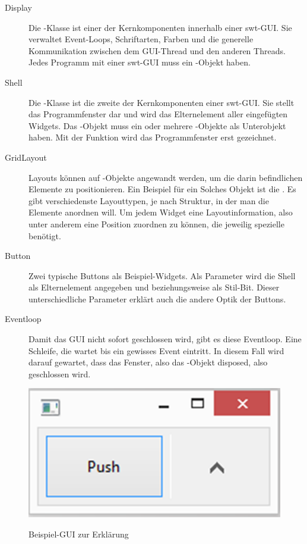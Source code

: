 \begin{description}
	\item[{Display}]
    Die -Klasse ist einer der Kernkomponenten innerhalb einer \acrshort{swt}-\acrshort{GUI}.
    Sie verwaltet Event-Loops, Schriftarten, Farben und die generelle Kommunikation zwischen dem \acrshort{GUI}-Thread
    und den anderen Threads. Jedes Programm mit einer \acrshort{swt}-\acrshort{GUI} muss ein -Objekt haben.

    \item[{Shell}]
    Die -Klasse ist die zweite der Kernkomponenten einer \acrshort{swt}-\acrshort{GUI}.
    Sie stellt das Programmfenster dar und wird das Elternelement aller eingefügten Widgets.
		Das -Objekt muss ein oder mehrere -Objekte als Unterobjekt haben.
    Mit der Funktion  wird das Programmfenster erst gezeichnet.

    \item[{GridLayout}]
    Layouts können auf -Objekte angewandt werden, um die darin befindlichen
		Elemente zu positionieren. Ein Beispiel für ein Solches Objekt ist die .
    Es gibt verschiedenste Layouttypen, je nach Struktur, in der man die Elemente anordnen will.
    Um jedem Widget eine Layoutinformation, also unter anderem eine Position zuordnen zu können,
		die jeweilig spezielle  benötigt.

    \item[{Button}]
    Zwei typische Buttons als Beispiel-Widgets. Als Parameter wird die Shell als
    Elternelement angegeben und  beziehungsweise 
    als Stil-Bit. Dieser unterschiedliche Parameter erklärt auch die andere Optik
    der Buttons.

    \item[{Eventloop}]
    Damit das \acrshort{GUI} nicht sofort geschlossen wird, gibt es diese Eventloop.
		Eine Schleife, die wartet bis ein gewisses Event eintritt. In diesem Fall wird
		darauf gewartet, dass das Fenster, also das -Objekt disposed, also
		geschlossen wird.

\end{description}

\begin{figure}[htb]
	\centering
	\includegraphics[]{images/erklaerungsgui.png}
	\label{erklaerungsgui}
  \caption{Beispiel-\acrshort{GUI} zur Erklärung}
\end{figure}
